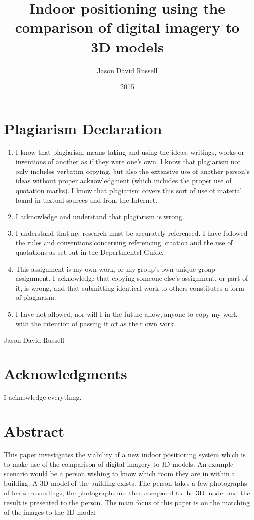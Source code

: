\documentclass[11pt,a4paper]{article}
\title{Indoor positioning using the comparison of digital imagery to 3D models}
\date{2015}
\author{Jason David Russell}
\begin{document}
\maketitle
\thispagestyle{empty}

\setcounter{page}{0}

\newpage
\section*{Plagiarism Declaration}
	\begin{enumerate}
		\item
			I know that plagiarism means taking and using the ideas, writings, works or inventions of another as if they were one's own. I know that plagiarism not only includes verbatim copying, but also the extensive use of another person's ideas without proper acknowledgment (which includes the proper use of quotation marks). I know that plagiarism covers this sort of use of material found in textual sources and from the Internet.
		\item
			I acknowledge and understand that plagiarism is wrong.
		\item
			I understand that my research must be accurately referenced. I have followed the rules and conventions concerning referencing, citation and the use of quotations as set out in the Departmental Guide.
		\item
			This assignment is my own work, or my group's own unique group assignment.
			I acknowledge that copying someone else's assignment, or part of it, is wrong, and that submitting identical work to others constitutes a form of plagiarism.
		\item
			I have not allowed, nor will I in the future allow, anyone to copy my work with the intention of passing it off as their own work.
	\end{enumerate}
	Jason David Russell

\newpage
\section*{Acknowledgments}
	I acknowledge everything.

\newpage
\section*{Abstract}
	This paper investigates the viability of a new indoor positioning system which is to make use of the comparison of digital imagery to 3D models. An example scenario would be a person wishing to know which room they are in within a building. A 3D model of the building exists. The person takes a few photographs of her surroundings, the photographs are then compared to the 3D model and the result is presented to the person. The main focus of this paper is on the matching of the images to the 3D model.
\end{document}
